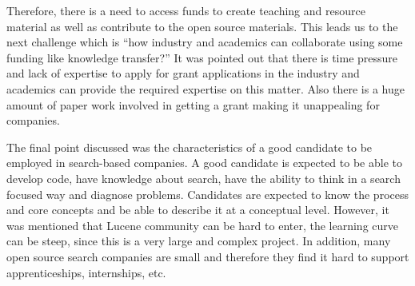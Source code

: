 Therefore, there is a need to access funds to create teaching and resource material as well as contribute to the open source materials. 
This leads us to the next challenge which is ``how industry and academics can collaborate using some funding like knowledge transfer?''
It was pointed out that there is time pressure and lack of expertise to apply for grant applications in the industry and academics can provide the required expertise on this matter. 
Also there is a huge amount of paper work involved in getting a grant making it unappealing for companies. 


The final point discussed was the characteristics of a good candidate to be employed in search-based companies.
A good candidate is expected to be able to develop code, have knowledge about search, have the ability to think in a search focused way and diagnose problems.
Candidates are expected to know the process and core concepts and be able to describe it at a conceptual level.  
However, it was mentioned that Lucene community can be hard to enter, the learning curve can be steep, since this is a very large and complex project. 
In addition, many open source search companies are small and therefore they find it hard to support apprenticeships, internships, etc. 




